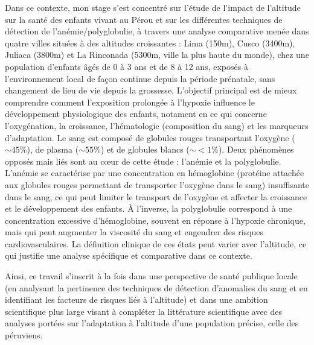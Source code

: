 \documentclass[12pt,a4paper]{article}
\begin{document}
Dans ce contexte, mon stage s'est concentré sur l'étude de l'impact de l'altitude sur la santé des enfants vivant au Pérou et sur les différentes techniques de détection de l'anémie/polyglobulie, à travers une analyse comparative menée dans quatre villes situées à des altitudes croissantes : Lima (150m), Cusco (3400m), Juliaca (3800m) et La Rinconada (5300m, ville la plus haute du monde), chez une population d’enfants âgés de 0 à 3 ans et de 8 à 12 ans, exposés à l’environnement local de façon continue depuis la période prénatale, sans changement de lieu de vie depuis la grossesse. L'objectif principal est de mieux comprendre comment l'exposition prolongée à l'hypoxie influence le développement physiologique des enfants, notament en ce qui concerne l'oxygénation, la croissance, l'hématologie (composition du sang) et les marqueurs d'adaptation. Le sang est composé de globules rouges transportant l'oxygène ($\sim 45\%$), de plasma ($\sim 55\%$) et de globules blancs ($\sim <1\%$). Deux phénomènes opposés mais liés sont au cœur de cette étude : l'anémie et la polyglobulie. L'anémie se caractérise par une concentration en hémoglobine (protéine attachée aux globules rouges permettant de transporter l'oxygène dans le sang) insuffisante dans le sang, ce qui peut limiter le transport de l’oxygène et affecter la croissance et le développement des enfants. À l’inverse, la polyglobulie correspond à une concentration excessive d’hémoglobine, souvent en réponse à l’hypoxie chronique, mais qui peut augmenter la viscosité du sang et engendrer des risques cardiovasculaires. La définition clinique de ces états peut varier avec l’altitude, ce qui justifie une analyse spécifique et comparative dans ce contexte.

Ainsi, ce travail s'inscrit à la fois dans une perspective de santé publique locale (en analysant la pertinence des techniques de détection d'anomalies du sang et en identifiant les facteurs de risques liés à l'altitude) et dans une ambition scientifique plus large visant à compléter la littérature scientifique avec des analyses portées sur l'adaptation à l'altitude d'une population précise, celle des péruviens.

\end{document}
